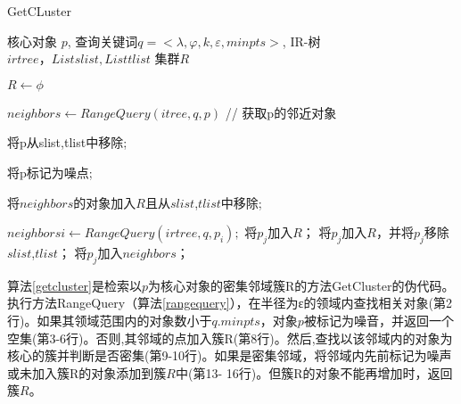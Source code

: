 \begin{algorithm}
	\caption{GetCLuster}
	\label{getcluster}
	\begin{algorithmic}[1] %
			\Require 核心对象 $p$, 查询关键词$q=<\lambda,\varphi,k,\varepsilon, minpts>$, IR-树 $irtree，List slist, List tlist$
			\Ensure 集群$R$

			\State $R \gets \phi$

			\State $neighbors \gets RangeQuery(itree, q, p)$ // 获取p的邻近对象


				\State 将p从slist,tlist中移除;

				\State 将p标记为噪点;

				\State {}
			\Else
				\State 将$neighbors$的对象加入$R$且从$slist$,$tlist$中移除;
				
						\State $neighborsi \gets RangeQuery(irtree,q,p_i);$
										\State 将$p_j$加入$R$；
									\State 将$p_j$加入$R$，并将$p_j$移除$slist$,$tlist$；
									\State 将$p_j$加入$neighbors$；
								\EndIf
							\EndFor
						\EndIf
				\EndFor
			\EndIf

	\State {}
	\end{algorithmic}
\end{algorithm}


算法\ref{getcluster}是检索以$p$为核心对象的密集邻域簇R的方法GetCluster的伪代码。执行方法RangeQuery（算法\ref{rangequery}），在半径为ε的领域内查找相关对象(第2行)。如果其领域范围内的对象数小于$q.minpts$，对象$p$被标记为噪音，并返回一个空集(第3-6行)。否则,其邻域的点加入簇R(第8行)。然后,查找以该邻域内的对象为核心的簇并判断是否密集(第9-10行)。如果是密集邻域，将邻域内先前标记为噪声或未加入簇R的对象添加到簇$R$中(第13-
16行)。但簇R的对象不能再增加时，返回簇$R$。

